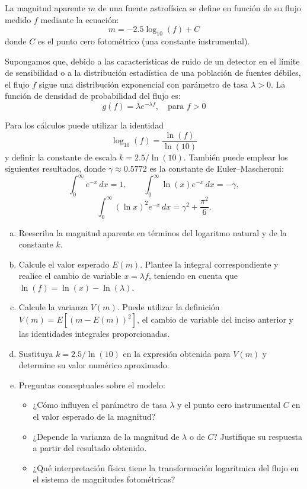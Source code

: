 \documentclass{article}
\begin{document}
La magnitud aparente $m$ de una fuente astrofísica se define en función de su flujo medido $f$ mediante la ecuación:
$$ m = -2.5 \log_{10}(f) + C $$
donde $C$ es el punto cero fotométrico (una constante instrumental). 

Supongamos que, debido a las características de ruido de un detector en el límite de sensibilidad o a la distribución estadística de una población de fuentes débiles, el flujo $f$ sigue una distribución exponencial con parámetro de tasa $\lambda > 0$. La función de densidad de probabilidad del flujo es:
$$ g(f) = \lambda e^{-\lambda f}, \quad \text{para } f > 0 $$

Para los cálculos puede utilizar la identidad
$$
\log_{10}(f)=\frac{\ln(f)}{\ln(10)}
$$
y definir la constante de escala $k=2.5/\ln(10)$. También puede emplear los siguientes resultados, donde $\gamma\approx 0.5772$ es la constante de Euler--Mascheroni:
$$
\int_{0}^{\infty}e^{-x}\,dx=1, \qquad
\int_{0}^{\infty}\ln(x)e^{-x}\,dx=-\gamma,
$$
$$
\int_{0}^{\infty}(\ln x)^2e^{-x}\,dx
=\gamma^2+\frac{\pi^2}{6}.
$$

\begin{enumerate}[a)]
    \item Reescriba la magnitud aparente en términos del logaritmo natural y de la constante $k$.
    \item Calcule el valor esperado $E(m)$. Plantee la integral correspondiente y realice el cambio de variable $x=\lambda f$, teniendo en cuenta que $\ln(f)=\ln(x)-\ln(\lambda)$.
    \item Calcule la varianza $V(m)$. Puede utilizar la definición $V(m)=E[(m-E(m))^2]$, el cambio de variable del inciso anterior y las identidades integrales proporcionadas.
    \item Sustituya $k=2.5/\ln(10)$ en la expresión obtenida para $V(m)$ y determine su valor numérico aproximado.
    \item Preguntas conceptuales sobre el modelo:
    \begin{itemize}
        \item ¿Cómo influyen el parámetro de tasa $\lambda$ y el punto cero instrumental $C$ en el valor esperado de la magnitud?
        \item ¿Depende la varianza de la magnitud de $\lambda$ o de $C$? Justifique su respuesta a partir del resultado obtenido.
        \item ¿Qué interpretación física tiene la transformación logarítmica del flujo en el sistema de magnitudes fotométricas?
    \end{itemize}
\end{enumerate}
\end{document}
